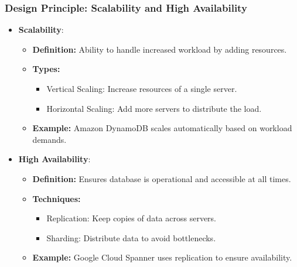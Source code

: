 \documentclass[aspectratio=169]{beamer}
\begin{document}
\begin{frame}[fragile]
    \frametitle{Design Principle: Scalability and High Availability}
    \begin{itemize}
        \item \textbf{Scalability}:
        \begin{itemize}
            \item \textbf{Definition:} Ability to handle increased workload by adding resources.
            \item \textbf{Types:}
            \begin{itemize}
                \item Vertical Scaling: Increase resources of a single server.
                \item Horizontal Scaling: Add more servers to distribute the load.
            \end{itemize}
            \item \textbf{Example:} Amazon DynamoDB scales automatically based on workload demands.
        \end{itemize}

        \item \textbf{High Availability}:
        \begin{itemize}
            \item \textbf{Definition:} Ensures database is operational and accessible at all times.
            \item \textbf{Techniques:}
            \begin{itemize}
                \item Replication: Keep copies of data across servers.
                \item Sharding: Distribute data to avoid bottlenecks.
            \end{itemize}
            \item \textbf{Example:} Google Cloud Spanner uses replication to ensure availability.
        \end{itemize}
    \end{itemize}
\end{frame}
\end{document}
